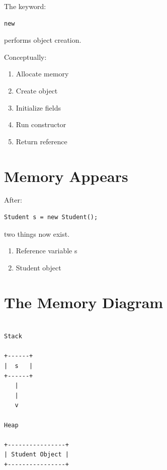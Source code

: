 \documentclass[11pt,a4paper]{book}
\begin{document}
The keyword:

\begin{verbatim}
new
\end{verbatim}

performs object creation.

Conceptually:

\begin{enumerate}
\item Allocate memory
\item Create object
\item Initialize fields
\item Run constructor
\item Return reference
\end{enumerate}


\section{Memory Appears}

After:

\begin{verbatim}
Student s = new Student();
\end{verbatim}

two things now exist.

\begin{enumerate}
\item Reference variable s
\item Student object
\end{enumerate}


\section{The Memory Diagram}

\begin{verbatim}

Stack

+------+
|  s   |
+------+
   |
   |
   v

Heap

+----------------+
| Student Object |
+----------------+

\end{verbatim}

\end{document}
